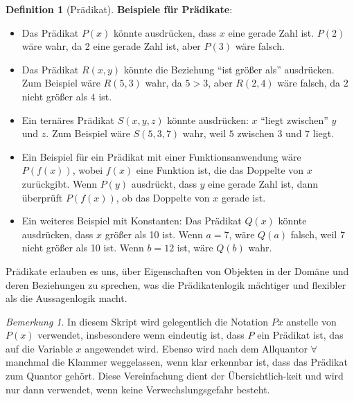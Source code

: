 \documentclass{book}
\theoremstyle{plain}
\theoremstyle{remark}
\newtheorem*{remark}{Bemerkung}
\theoremstyle{definition}
\newtheorem{definition}{Definition}[section]
\begin{document}
\begin{definition}[Prädikat]
\textbf{Beispiele für Prädikate}:
\begin{itemize}
    \item Das Prädikat \(P(x)\) könnte ausdrücken, dass \(x\) eine gerade Zahl ist. \(P(2)\) wäre wahr, da 2 eine gerade Zahl ist, aber \(P(3)\) wäre falsch.
    \item Das Prädikat \(R(x, y)\) könnte die Beziehung \enquote{ist größer als} ausdrücken. Zum Beispiel wäre \(R(5, 3)\) wahr, da \(5 > 3\), aber \(R(2, 4)\) wäre falsch, da \(2\) nicht größer als \(4\) ist.
    \item Ein ternäres Prädikat \(S(x, y, z)\) könnte ausdrücken: \(x\) \enquote{liegt zwischen} \(y\) und \(z\). Zum Beispiel wäre \(S(5, 3, 7)\) wahr, weil \(5\) zwischen \(3\) und \(7\) liegt.
    \item Ein Beispiel für ein Prädikat mit einer Funktionsanwendung wäre \(P(f(x))\), wobei \(f(x)\) eine Funktion ist, die das Doppelte von \(x\) zurückgibt. Wenn \(P(y)\) ausdrückt, dass \(y\) eine gerade Zahl ist, dann überprüft \(P(f(x))\), ob das Doppelte von \(x\) gerade ist.
    \item Ein weiteres Beispiel mit Konstanten: Das Prädikat \(Q(x)\) könnte ausdrücken, dass \(x\) größer als 10 ist. Wenn \(a = 7\), wäre \(Q(a)\) falsch, weil 7 nicht größer als 10 ist. Wenn \(b = 12\) ist, wäre \(Q(b)\) wahr.
\end{itemize}

Prädikate erlauben es uns, über Eigenschaften von Objekten in der Domäne und deren Beziehungen zu sprechen, was die Prädikatenlogik mächtiger und flexibler als die Aussagenlogik macht.
\end{definition}
\begin{remark}
In diesem Skript wird gelegentlich die Notation \(Px\) anstelle von \(P(x)\) verwendet, insbesondere wenn eindeutig ist, dass \(P\) ein Prädikat ist, das auf die Variable \(x\) angewendet wird. Ebenso wird nach dem Allquantor \(\forall\) manchmal die Klammer weggelassen, wenn klar erkennbar ist, dass das Prädikat zum Quantor gehört. Diese Vereinfachung dient der Übersichtlich-keit und wird nur dann verwendet, wenn keine Verwechslungsgefahr besteht.
\end{remark}
\end{document}
